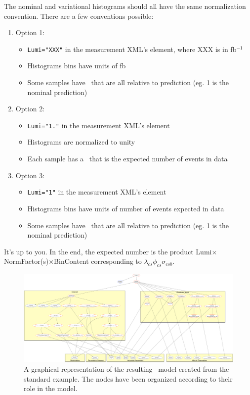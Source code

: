 The nominal and variational histograms should all have the same normalization convention. There are a few conventions possible:
\begin{enumerate}
\item[] Option 1:
	\begin{itemize}
	 \item \texttt{Lumi="XXX"} in the measurement XML's element, where XXX is in fb$^{-1}$
	\item Histograms bins have units of fb
	\item Some samples have \NF\ that are all relative to prediction (eg. 1 is the nominal prediction)
	\end{itemize}
\item[] Option 2:
	\begin{itemize}
	\item \texttt{Lumi="1."} in the measurement XML's element
	\item Histograms are normalized to unity
	\item Each sample has a \NF\ that is the expected number of events in data
	\end{itemize}
\item[] Option 3:
	\begin{itemize}
	\item \texttt{Lumi="1"} in the measurement XML's element
	\item Histograms bins have units of number of events expected in data
	\item Some samples have \NF\ that are all relative to prediction (eg. 1 is the nominal prediction)
	\end{itemize}
\end{enumerate}
It's up to you. In the end, the expected number is the product Lumi$\times$NormFactor(s)$\times$BinContent corresponding to $\lambda_{cs}\phi_{cs}\sigma_{csb}$.  


\clearpage
\begin{figure}[h]
\begin{center}
\includegraphics[width=.8\textheight,angle=90]{figures/histfactory/Example_graph}
\caption{A graphical representation of the resulting \RooFit\ model created from the standard example.  The nodes have been organized according to their role in the model.}
\label{fig:PDFGraph}
\end{center}
\end{figure}

